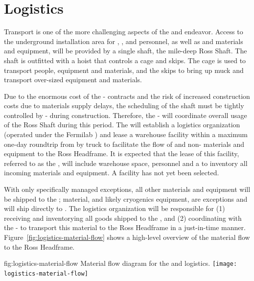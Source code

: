 \section{Logistics}
\label{sec:fdsp-tc-log}


Transport is one of the more challenging aspects of the  and  endeavor.  
Access to the underground installation area for , , and  personnel, as well as   and   materials and equipment, will be provided by a single shaft, the mile-deep Ross Shaft. 
The shaft is outfitted with a hoist that controls a cage and skips. The cage is used to transport people, equipment and materials, and the skips to bring up muck and transport over-sized equipment and materials.

Due to the enormous cost of the - contracts and the risk of increased construction costs due to materials supply delays, the scheduling of the shaft must be tightly controlled by - during construction. Therefore, the -  will coordinate overall usage of the Ross Shaft during this period. The  will establish a logistics organization (operated under the Fermilab ) and lease a warehouse facility within a maximum one-day roundtrip from  by truck to facilitate the flow of   and  non- materials and equipment to the Ross Headframe. It is expected that the lease of this facility, referred to as the , will include warehouse space, personnel and a  to inventory all incoming materials and equipment. A facility has not yet been selected. 

With only specifically managed exceptions, all other materials and equipment will be shipped to the ;  material, and likely cryogenics equipment, are exceptions and will ship directly to . 
The logistics  organization will be responsible for (1) receiving and inventorying all  goods shipped to the , and (2) coordinating with the -  to transport this material to the Ross Headframe in a just-in-time manner. 
Figure~\ref{fig:logistics-material-flow} shows a high-level overview of the material flow to the Ross Headframe.


 
\begin{dunefigure}{fig:logistics-material-flow}
  {Material flow diagram for the  and  logistics.}
 \texttt{[image: logistics-material-flow]}
\end{dunefigure}


